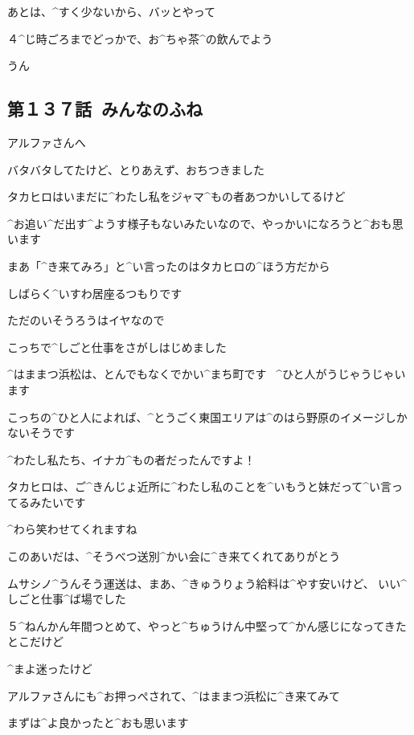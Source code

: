 \Shiba あとは、^{すく}{少}ないから、バッとやって

\Shiba ４^{じ}{時}ごろまでどっかで、お^{ちゃ}{茶}^{の}{飲}んでよう

\Kokone うん


\subsection{第１３７話\ みんなのふね}

\page[92]
\Makki アルファさんへ

\page
\Makki バタバタしてたけど、とりあえず、おちつきました

\Makki タカヒロはいまだに^{わたし}{私}をジャマ^{もの}{者}あつかいしてるけど

\Makki ^{お}{追}い^{だ}{出}す^{ようす}{様子}もないみたいなので、やっかいになろうと^{おも}{思}います

\page
\Makki まあ「^{き}{来}てみろ」と^{い}{言}ったのはタカヒロの^{ほう}{方}だから

\Makki しばらく^{いすわ}{居座}るつもりです

\Makki ただのいそうろうはイヤなので

\Makki こっちで^{しごと}{仕事}をさがしはじめました

\page
\Makki ^{はままつ}{浜松}は、とんでもなくでかい^{まち}{町}です
\ ^{ひと}{人}がうじゃうじゃいます

\Makki こっちの^{ひと}{人}によれば、^{とうごく}{東国}エリアは^{のはら}{野原}のイメージしかないそうです

\Makki ^{わたし}{私}たち、イナカ^{もの}{者}だったんですよ！

\page
\Makki タカヒロは、ご^{きんじょ}{近所}に^{わたし}{私}のことを^{いもうと}{妹}だって^{い}{言}ってるみたいです

\Makki ^{わら}{笑}わせてくれますね

\page
\Makki このあいだは、^{そうべつ}{送別}^{かい}{会}に^{き}{来}てくれてありがとう

\Makki ムサシノ^{うんそう}{運送}は、まあ、^{きゅうりょう}{給料}は^{やす}{安}いけど、
いい^{しごと}{仕事}^{ば}{場}でした

\Makki ５^{ねんかん}{年間}つとめて、やっと^{ちゅうけん}{中堅}って^{かん}{感}じになってきたとこだけど

\Makki ^{まよ}{迷}ったけど

\page
\Makki アルファさんにも^{お}{押}っぺされて、^{はままつ}{浜松}に^{き}{来}てみて

\Makki まずは^{よ}{良}かったと^{おも}{思}います

